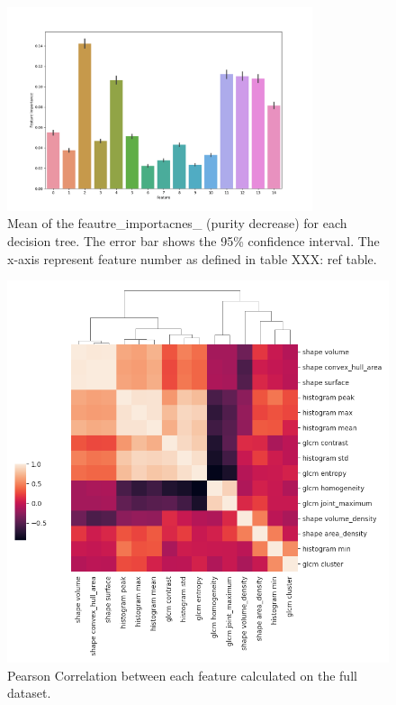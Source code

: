 

\begin{figure}[H]
    \centering
    \includegraphics[width=0.8\textwidth]{Figures/feature_importance.png}
    \caption{Mean of the feautre\_importacnes\_ (purity decrease) for each decision tree. The
    error bar shows the 95\% confidence interval. The x-axis represent feature
    number as defined in table XXX: ref table.  }  
    \label{fig:feature_importance} 
\end{figure}


\begin{figure}[H]
    \centering
    \includegraphics[width=1\textwidth]{Figures/feature_correlation.png}
    \caption{Pearson Correlation between each feature calculated on the full
    dataset. }  
\end{figure}





